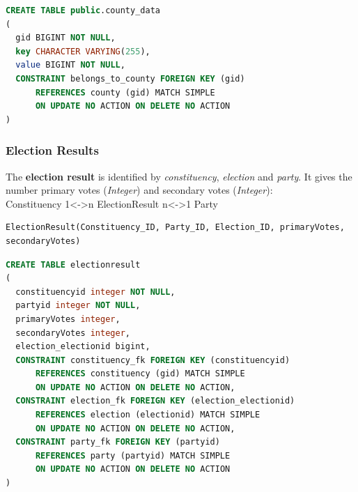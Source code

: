 \begin{lstlisting}[caption=County Data SQL,language=SQL]
CREATE TABLE public.county_data
(
  gid BIGINT NOT NULL,
  key CHARACTER VARYING(255),
  value BIGINT NOT NULL,
  CONSTRAINT belongs_to_county FOREIGN KEY (gid)
      REFERENCES county (gid) MATCH SIMPLE
      ON UPDATE NO ACTION ON DELETE NO ACTION
)
\end{lstlisting}



\subsubsection{Election Results}\label{ImplementationElectionResult}


The \textbf{election result} is identified by \textit{constituency},
\textit{election} and \textit{party}. It gives the number primary votes
(\textit{Integer}) and secondary votes (\textit{Integer}): \\


Constituency 1\textless{}-\textgreater{}n
ElectionResult n\textless{}-\textgreater{}1
Party

\begin{lstlisting}[caption=ElectionResult Relational Algebra,numbers=none]
ElectionResult(Constituency_ID, Party_ID, Election_ID, primaryVotes, secondaryVotes)
\end{lstlisting}



\begin{lstlisting}[caption=ElectionResult SQL,language=sql]
CREATE TABLE electionresult
(
  constituencyid integer NOT NULL,
  partyid integer NOT NULL,
  primaryVotes integer,
  secondaryVotes integer,
  election_electionid bigint,
  CONSTRAINT constituency_fk FOREIGN KEY (constituencyid)
      REFERENCES constituency (gid) MATCH SIMPLE
      ON UPDATE NO ACTION ON DELETE NO ACTION,
  CONSTRAINT election_fk FOREIGN KEY (election_electionid)
      REFERENCES election (electionid) MATCH SIMPLE
      ON UPDATE NO ACTION ON DELETE NO ACTION,
  CONSTRAINT party_fk FOREIGN KEY (partyid)
      REFERENCES party (partyid) MATCH SIMPLE
      ON UPDATE NO ACTION ON DELETE NO ACTION
)
\end{lstlisting}

